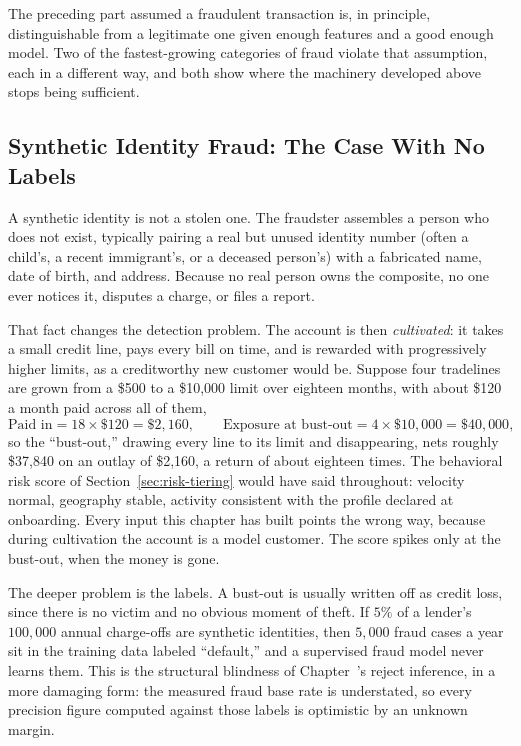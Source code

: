 \documentclass[../ai_in_finance]{subfiles}
\begin{document}
The preceding part assumed a fraudulent transaction is, in principle, distinguishable from a legitimate one given enough features and a good enough model. Two of the fastest-growing categories of fraud violate that assumption, each in a different way, and both show where the machinery developed above stops being sufficient.

\subsection{Synthetic Identity Fraud: The Case With No Labels}
\label{sec:synthetic-identity}

A synthetic identity is not a stolen one. The fraudster assembles a person who does not exist, typically pairing a real but unused identity number (often a child's, a recent immigrant's, or a deceased person's) with a fabricated name, date of birth, and address. Because no real person owns the composite, no one ever notices it, disputes a charge, or files a report.

That fact changes the detection problem. The account is then \emph{cultivated}: it takes a small credit line, pays every bill on time, and is rewarded with progressively higher limits, as a creditworthy new customer would be. Suppose four tradelines are grown from a \$500 to a \$10,000 limit over eighteen months, with about \$120 a month paid across all of them,
\begin{equation*}
\text{Paid in} = 18 \times \$120 = \$2{,}160, \qquad \text{Exposure at bust-out} = 4 \times \$10{,}000 = \$40{,}000,
\end{equation*}
so the ``bust-out,'' drawing every line to its limit and disappearing, nets roughly \$37,840 on an outlay of \$2,160, a return of about eighteen times. The behavioral risk score of Section~\ref{sec:risk-tiering} would have said throughout: velocity normal, geography stable, activity consistent with the profile declared at onboarding. Every input this chapter has built points the wrong way, because during cultivation the account is a model customer. The score spikes only at the bust-out, when the money is gone.

The deeper problem is the labels. A bust-out is usually written off as credit loss, since there is no victim and no obvious moment of theft. If $5\%$ of a lender's $100{,}000$ annual charge-offs are synthetic identities, then $5{,}000$ fraud cases a year sit in the training data labeled ``default,'' and a supervised fraud model never learns them. This is the structural blindness of Chapter~'s reject inference, in a more damaging form: the measured fraud base rate is understated, so every precision figure computed against those labels is optimistic by an unknown margin.
\end{document}
